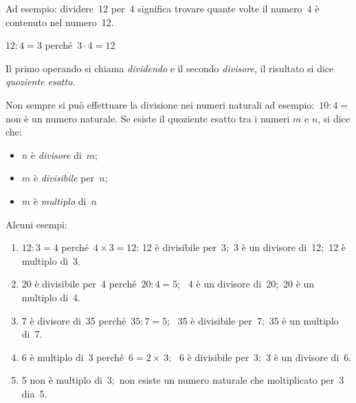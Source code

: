 Ad esempio: dividere~12 per~4 significa trovare quante volte il numero~4 è 
contenuto nel numero~12.

\begin{minipage}{0.80\textwidth}
 \centering
 \(12 : 4 = 3\) perché~\(3 \cdot 4 = 12\)

% 
\end{minipage}%
\begin{minipage}{0.15\textwidth}
 \centering
\begin{inaccessibleblock}[]
\end{inaccessibleblock}
\end{minipage}%

Il primo operando si chiama \emph{dividendo} e il secondo \emph{divisore}, 
il risultato si dice \emph{quoziente esatto}.

Non sempre si può effettuare la divisione nei numeri naturali ad 
esempio:~\(10 : 4 =\) non è un numero naturale.
Se esiste il quoziente esatto tra i numeri \(m\) e \(n\), si dice che:

\begin{multicols}{3}
\begin{itemize} [noitemsep]
 \item \(n\) è \emph{divisore} di~\(m\);
 \item \(m\) è \emph{divisibile} per~\(n\);
 \item \(m\) è \emph{multiplo} di~\(n\)
\end{itemize}
\end{multicols}


 \begin{esempio}{}{}
Alcuni esempi:
\begin{enumerate} [noitemsep]
\item \(12:3=4\) perché~\(4 \times 3 = 12\): 
12 è divisibile per~3;~3 è un divisore di~12;~12 è multiplo di~3.
\item 20 è divisibile per~4 perché~\(20:4=5\);~
4 è un divisore di~20;~20 è un multiplo di~4.
\item 7 è divisore di~35 perché~\(35:7=5\);~ 
35 è divisibile per~7;~35 è un multiplo di~7.
\item 6 è multiplo di~3 perché~\(6=2\times~3\);~
6 è divisibile per~3;~3 è un divisore di~6.
\item 5 non è multiplo di~3;~non esiste un numero naturale che moltiplicato 
per~3 dia~5.
\end{enumerate}
\end{esempio}

